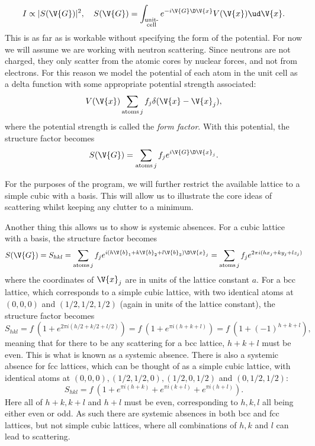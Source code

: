 \documentclass[main.tex]{subfiles}
\begin{document}
	\begin{equation}
		I \propto |S(\V{G})|^2, \quad S(\V{G}) = \int_{\substack{\text{unit-} \\\text{cell}}} e^{-i \V{G} \D \V{x}} V(\V{x}) \ud \V{x}.
	\end{equation}
	This is as far as is workable without specifying the form of the potential. For now we will assume we are working with neutron scattering. Since neutrons are not charged, they only scatter from the atomic cores by nuclear forces, and not from electrons. For this reason we model the potential of each atom in the unit cell as a delta function with some appropriate potential strength associated:
	\begin{equation}\label{eq:Scat_neutron_pot}
		V(\V{x}) \sum_{\text{atoms} \,j} f_j \delta(\V{x}-\V{x}_j),
	\end{equation}
	where the potential strength is called the \textit{form factor}. With this potential, the structure factor becomes
	\begin{equation}\label{eq:Scat_struct}
		S(\V{G}) = \sum_{\text{atoms} \,j} f_j e^{i \V{G} \D \V{x}_j}.
	\end{equation}
	
	For the purposes of the program, we will further restrict the available lattice to a simple cubic with a basis. This will allow us to illustrate the core ideas of scattering whilst keeping any clutter to a minimum.
	
	Another thing this allows us to show is systemic absences. For a cubic lattice with a basis, the structure factor becomes
	\begin{equation}\label{eq:Scat_struct_ortho}
		S(\V{G}) = S_{hkl} = \sum_{\text{atoms}\, j} f_j e^{i (h\V{b}_1 + k\V{b}_2 + l\V{b}_3) \D \V{x}_j} = \sum_{\text{atoms}\, j} f_j e^{2\pi i (hx_j + ky_j + lz_j)}
	\end{equation}
	where the coordinates of $ \V{x}_j $ are in units of the lattice constant $ a $. For a bcc lattice, which corresponds to a simple cubic lattice, with two identical atoms at $ (0,0,0) $ and $ (1/2, 1/2, 1/2) $ (again in units of the lattice constant), the structure factor becomes
	\begin{equation}
		S_{hkl} = f\ (1 + e^{2\pi i (h/2 + k/2 + l/2)}) = f\ (1 + e^{\pi i (h+k+l)}) = f \ (1+ (-1)^{h+k+l}),
	\end{equation}
	meaning that for there to be any scattering for a bcc lattice, $ h+k+l $ must be even. This is what is known as a systemic absence. There is also a systemic absence for fcc lattices, which can be thought of as a simple cubic lattice, with identical atoms at $ (0,0,0), (1/2, 1/2, 0), (1/2, 0, 1/2) $ and $ (0, 1/2, 1/2) $:
	\begin{equation}
		S_{hkl} = f\ (1 + e^{\pi i (h+k)} + e^{\pi i (k+l)} + e^{\pi i (h+l)}).
	\end{equation}
	Here all of $ h+k, k+l $ and $ h+l $ must be even, corresponding to $ h,k,l $ all being either even or odd. As such there are systemic absences in both bcc and fcc lattices, but not simple cubic lattices, where all combinations of $ h,k $ and $ l $ can lead to scattering.
	
\end{document}
